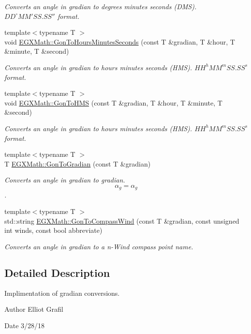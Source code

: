 \begin{DoxyCompactItemize}
\begin{DoxyCompactList}\small\item\em Converts an angle in gradian to degrees minutes seconds (D\+MS). ${DD}^{\circ}{MM}'{SS.SS}''$ format. \end{DoxyCompactList}\item 
{\footnotesize template$<$typename T $>$ }\\void \mbox{\hyperlink{group___e_g_x_math-_conversions-_angle_conversions-_gon_gaafdd71fd185afe7aa91f5c3ca531b668}{E\+G\+X\+Math\+::\+Gon\+To\+Hours\+Minutes\+Seconds}} (const T \&gradian, T \&hour, T \&minute, T \&second)
\begin{DoxyCompactList}\small\item\em Converts an angle in gradian to hours minutes seconds (H\+MS). ${HH}^h{MM}^m{SS.SS}^s$ format. \end{DoxyCompactList}\item 
{\footnotesize template$<$typename T $>$ }\\void \mbox{\hyperlink{group___e_g_x_math-_conversions-_angle_conversions-_gon_gac7263c178052895c8b1a71190b62aabc}{E\+G\+X\+Math\+::\+Gon\+To\+H\+MS}} (const T \&gradian, T \&hour, T \&minute, T \&second)
\begin{DoxyCompactList}\small\item\em Converts an angle in gradian to hours minutes seconds (H\+MS). ${HH}^h{MM}^m{SS.SS}^s$ format. \end{DoxyCompactList}\item 
{\footnotesize template$<$typename T $>$ }\\T \mbox{\hyperlink{group___e_g_x_math-_conversions-_angle_conversions-_gon_ga69eb507d44c7a0bfc5660ed3ebcc2f1a}{E\+G\+X\+Math\+::\+Gon\+To\+Gradian}} (const T \&gradian)
\begin{DoxyCompactList}\small\item\em Converts an angle in gradian to gradian. \[\alpha_{g}=\alpha_{g}\]. \end{DoxyCompactList}\item 
{\footnotesize template$<$typename T $>$ }\\std\+::string \mbox{\hyperlink{group___e_g_x_math-_conversions-_angle_conversions-_gon_ga1d8ed4116236694608d7409aa149f677}{E\+G\+X\+Math\+::\+Gon\+To\+Compass\+Wind}} (const T \&gradian, const unsigned int winds, const bool abbreviate)
\begin{DoxyCompactList}\small\item\em Converts an angle in gradian to a n-\/\+Wind compass point name. \end{DoxyCompactList}\end{DoxyCompactItemize}


\subsection{Detailed Description}
Implimentation of gradian conversions. 

\begin{DoxyAuthor}{Author}
Elliot Grafil 
\end{DoxyAuthor}
\begin{DoxyDate}{Date}
3/28/18 
\end{DoxyDate}
